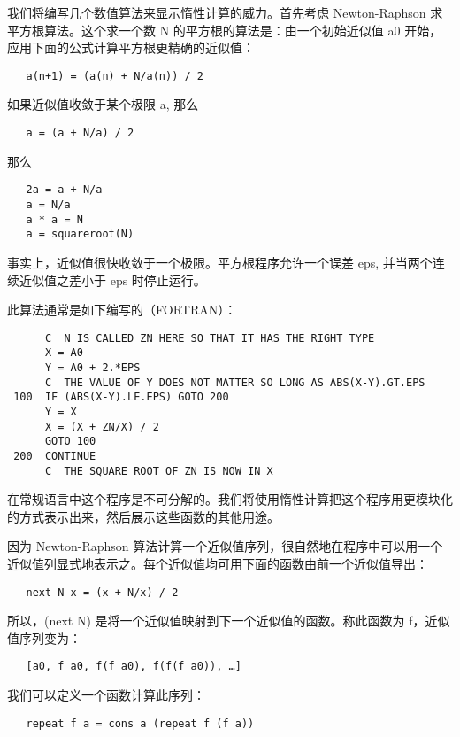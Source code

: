 \documentclass[12pt,a4paper]{article}
\begin{document}
我们将编写几个数值算法来显示惰性计算的威力。首先考虑 Newton-Raphson 求平方根算法。这个求一个数 N 的平方根的算法是：由一个初始近似值 a0 开始，应用下面的公式计算平方根更精确的近似值：

\begin{verbatim}
   a(n+1) = (a(n) + N/a(n)) / 2
\end{verbatim}

如果近似值收敛于某个极限 a, 那么

\begin{verbatim}
   a = (a + N/a) / 2
\end{verbatim}

那么

\begin{verbatim}
   2a = a + N/a
   a = N/a
   a * a = N
   a = squareroot(N)
\end{verbatim}

事实上，近似值很快收敛于一个极限。平方根程序允许一个误差 eps, 并当两个连续近似值之差小于 eps 时停止运行。

此算法通常是如下编写的（FORTRAN）：

\begin{verbatim}
      C  N IS CALLED ZN HERE SO THAT IT HAS THE RIGHT TYPE
      X = A0
      Y = A0 + 2.*EPS
      C  THE VALUE OF Y DOES NOT MATTER SO LONG AS ABS(X-Y).GT.EPS
 100  IF (ABS(X-Y).LE.EPS) GOTO 200
      Y = X
      X = (X + ZN/X) / 2
      GOTO 100
 200  CONTINUE
      C  THE SQUARE ROOT OF ZN IS NOW IN X
\end{verbatim}

在常规语言中这个程序是不可分解的。我们将使用惰性计算把这个程序用更模块化的方式表示出来，然后展示这些函数的其他用途。

因为 Newton-Raphson 算法计算一个近似值序列，很自然地在程序中可以用一个近似值列显式地表示之。每个近似值均可用下面的函数由前一个近似值导出：

\begin{verbatim}
   next N x = (x + N/x) / 2
\end{verbatim}

所以，(next N) 是将一个近似值映射到下一个近似值的函数。称此函数为 f，近似值序列变为：

\begin{verbatim}
   [a0, f a0, f(f a0), f(f(f a0)), …]
\end{verbatim}

我们可以定义一个函数计算此序列：

\begin{verbatim}
   repeat f a = cons a (repeat f (f a))
\end{verbatim}
\end{document}
